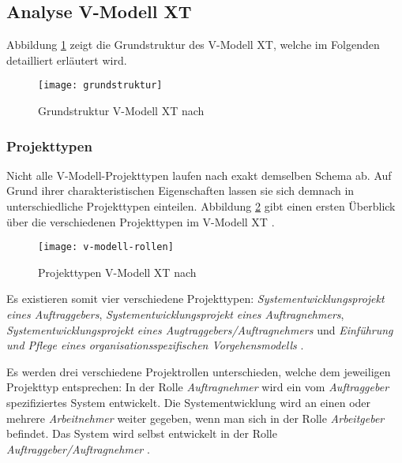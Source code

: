 \subsection{Analyse V-Modell XT}

Abbildung \ref{fig:grundstruktur} zeigt die Grundstruktur des V-Modell XT, welche im Folgenden detailliert erläutert wird.
\begin{figure}[htp]
\begin{center}
  \texttt{[image: grundstruktur]} %
  \caption{Grundstruktur V-Modell XT nach \cite{2004vmodell}}
  \label{fig:grundstruktur}
\end{center}
\end{figure}

\subsubsection{Projekttypen}
Nicht alle V-Modell-Projekttypen laufen nach exakt demselben Schema ab. Auf Grund ihrer charakteristischen Eigenschaften lassen sie sich demnach in unterschiedliche Projekttypen einteilen. Abbildung \ref{fig:Projekttypen} gibt einen ersten Überblick über die verschiedenen Projekttypen im V-Modell XT \cite{2004vmodell}.

\begin{figure}[htp]
\begin{center}
  \texttt{[image: v-modell-rollen]} %
  \caption{Projekttypen V-Modell XT nach \cite{2004vmodell}}
  \label{fig:Projekttypen}
\end{center}
\end{figure}

Es existieren somit vier verschiedene Projekttypen: \textit{Systementwicklungsprojekt eines Auftraggebers}, \textit{Systementwicklungsprojekt eines Auftragnehmers},  \textit{Systementwicklungsprojekt eines Augtraggebers/Auftragnehmers}  und \textit{Einführung und Pflege eines organisationsspezifischen Vorgehensmodells} \cite{reinhard2008}. \newline

Es werden drei verschiedene Projektrollen unterschieden, welche dem jeweiligen Projekttyp entsprechen: In der Rolle \textit{Auftragnehmer} wird ein vom \textit{Auftraggeber} spezifiziertes System entwickelt. Die Systementwicklung wird an einen oder mehrere \textit{Arbeitnehmer} weiter gegeben, wenn man sich in der Rolle \textit{Arbeitgeber} befindet. Das System  wird selbst entwickelt in der Rolle \textit{Auftraggeber/Auftragnehmer} \cite{brack2010,2004vmodell}.\newline


